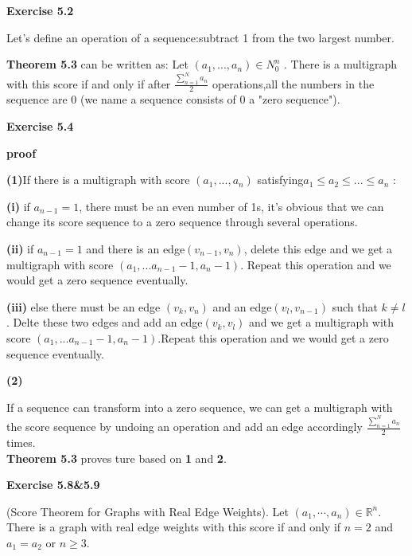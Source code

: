 \documentclass{article} %
\begin{document}
\textbf{Exercise 5.2}\par
	Let's define an operation of a sequence:subtract 1 from the two largest number. \par
	\textbf{Theorem 5.3} can be written as: Let $(a_1,...,a_n) \in N^{n}_0$ . There is a multigraph with this score if and only if after $\frac{\sum_{n=1}^Na_n}{2}$ operations,all the numbers in the sequence are 0 (we name a sequence consists of 0 a "zero sequence").\par
	\textbf{Exercise 5.4}\par
	\textbf{proof}\par 
	 \textbf{(1)}If there is a multigraph with score $(a_1,...,a_n)$ satisfying$a_1\leq a_2\leq ...\leq a_n$ :\par
	  \textbf{(i)} if $a_{n-1}=1$, there must be an even number of 1s, it's obvious that we can change its score sequence to a zero sequence through several operations.\par
	  \textbf{(ii)} if $a_{n-1}=1$ and there is an edge$(v_{n-1},v_n)$, delete this edge and we get a multigraph with score $(a_1,...a_{n-1}-1,a_n-1)$. Repeat this operation and we would get a zero sequence eventually.\par
	  \textbf{(iii)} else there must be an edge $(v_k,v_n)$ and an edge$(v_l,v_{n-1})$ such that $k\not=l$. Delte these two edges and add an edge$(v_k,v_l)$ and we get a multigraph with score $(a_1,...a_{n-1}-1,a_n-1)$.Repeat this operation and we would get a zero sequence eventually.\par
	  \textbf{(2)}\par
	  If a sequence can transform into a zero sequence, we can get a multigraph with the score sequence by undoing an operation and add an edge accordingly $\frac{\sum_{n=1}^Na_n}{2}$ times.\\
	  \textbf{Theorem 5.3} proves ture based on \textbf{1} and \textbf{2}.
	
	

\textbf{Exercise 5.8\&5.9}\par
	(Score Theorem for Graphs with Real Edge Weights). Let $(a_1,\cdots, a_n)\in\mathbb{R}^n$. 
	There is a graph with real edge weights with this score if and only if $n=2$ and $a_1=a_2$ or $n\ge 3$.
	 
\end{document}
